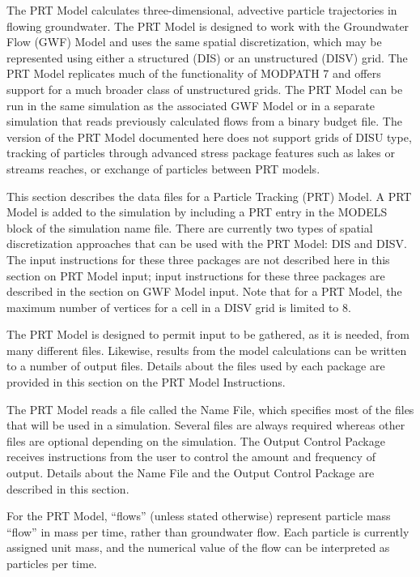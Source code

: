 The PRT Model calculates three-dimensional, advective particle trajectories in flowing groundwater. The PRT Model is designed to work with the Groundwater Flow (GWF) Model \citep{modflow6gwf} and uses the same spatial discretization, which may be represented using either a structured (DIS) or an unstructured (DISV) grid. The PRT Model replicates much of the functionality of MODPATH 7 \citep{pollock2016modpath7} and offers support for a much broader class of unstructured grids. The PRT Model can be run in the same simulation as the associated GWF Model or in a separate simulation that reads previously calculated flows from a binary budget file. The version of the PRT Model documented here does not support grids of DISU type, tracking of particles through advanced stress package features such as lakes or streams reaches, or exchange of particles between PRT models.

This section describes the data files for a \mf Particle Tracking (PRT) Model.  A PRT Model is added to the simulation by including a PRT entry in the MODELS block of the simulation name file.  There are currently two types of spatial discretization approaches that can be used with the PRT Model: DIS and DISV.  The input instructions for these three packages are not described here in this section on PRT Model input; input instructions for these three packages are described in the section on GWF Model input.  Note that for a PRT Model, the maximum number of vertices for a cell in a DISV grid is limited to 8.

The PRT Model is designed to permit input to be gathered, as it is needed, from many different files.  Likewise, results from the model calculations can be written to a number of output files. Details about the files used by each package are provided in this section on the PRT Model Instructions.

The PRT Model reads a file called the Name File, which specifies most of the files that will be used in a simulation. Several files are always required whereas other files are optional depending on the simulation. The Output Control Package receives instructions from the user to control the amount and frequency of output.  Details about the Name File and the Output Control Package are described in this section.

For the PRT Model, ``flows'' (unless stated otherwise) represent particle mass ``flow'' in mass per time, rather than groundwater flow.  Each particle is currently assigned unit mass, and the numerical value of the flow can be interpreted as particles per time.

